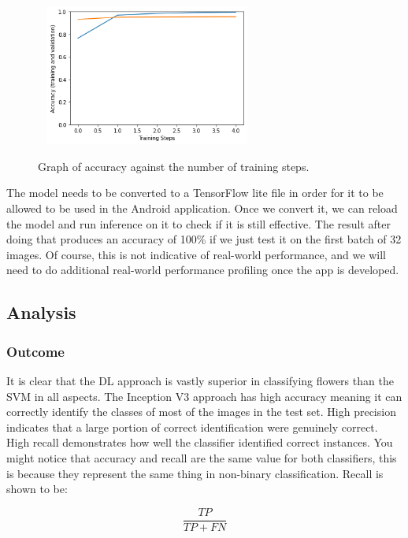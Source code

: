 \documentclass[12pt,a4paper]{report}
\begin{document}
\begin{figure}[h]\
    \centering
    \includegraphics[width=0.6\textwidth]{inception_acc.png}
    \caption{Graph of accuracy against the number of training steps.}
    \label{fig:incep_acc}
\end{figure}

The model needs to be converted to a TensorFlow lite file in order for it to be allowed to be used in the Android 
application. Once we convert it, we can reload the model and run inference on it to check if it is still effective. The 
result after doing that produces an accuracy of 100\% if we just test it on the first batch of 32 images. Of course, 
this is not indicative of real-world performance, and we will need to do additional real-world performance profiling 
once the app is developed. 

\subsection{Analysis}

\subsubsection{Outcome}

It is clear that the DL approach is vastly superior in classifying flowers than the SVM in all aspects. The Inception V3
approach has high accuracy meaning it can correctly identify the classes of most of the images in the test set. 
High precision indicates that a large portion of correct identification were genuinely correct. High recall demonstrates
how well the classifier identified correct instances. You might notice that accuracy and recall are the same value for 
both classifiers, this is because they represent the same thing in non-binary classification. Recall is shown to be:

\begin{equation}
    \frac{TP}{TP+FN}
\end{equation}
\end{document}

